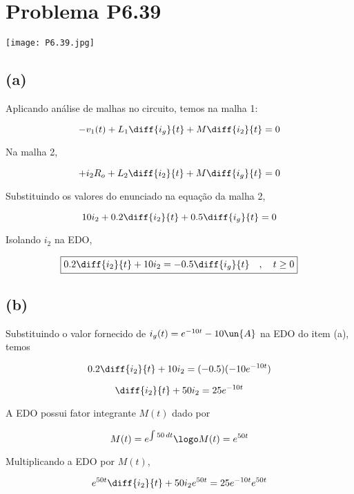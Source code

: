
\section*{Problema P6.39}

\renewcommand*\thesection{6.39}

\begin{center}
    \texttt{[image: P6.39.jpg]}
\end{center}

\subsection*{(a)}

Aplicando análise de malhas no circuito, temos na malha 1:

\begin{equation}\label{eq:6.39.1}
    -v_1(t) + L_1\diff{i_g}{t} + M\diff{i_2}{t} = 0
\end{equation}

Na malha 2,

\begin{equation}\label{eq:6.39.2}
    +i_2R_o + L_2\diff{i_2}{t} + M\diff{i_g}{t} = 0
\end{equation}

Substituindo os valores do enunciado na equação da malha 2,

\[ 10i_2 + 0.2\diff{i_2}{t} + 0.5\diff{i_g}{t} = 0 \]

Isolando $i_2$ na EDO, 

\[ \boxed{0.2\diff{i_2}{t} + 10i_2 = - 0.5\diff{i_g}{t} \quad , \quad t \geq 0}  \]

\subsection*{(b)}

Substituindo o valor fornecido de $i_g(t) = e^{-10t} - 10 \un{A} $ na EDO do item (a), temos

\[ 0.2\diff{i_2}{t} + 10i_2 = (-0.5) (-10e^{-10t}) \]

\[ \diff{i_2}{t} + 50i_2 = 25e^{-10t} \]

A EDO possui fator integrante $M(t)$ dado por 

\[ M(t) = e^{\int 50 \,dt} \logo M(t) = e^{50t} \]

Multiplicando a EDO por $M(t)$,

\[ e^{50t}\diff{i_2}{t} + 50i_2e^{50t} =  25e^{-10t}e^{50t} \]

